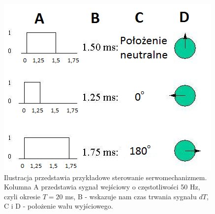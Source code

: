 \begin{figure}[H]
    \begin{center}
      \includegraphics[scale=0.7]{imgs/ster_serw.png}
 	\caption[Sterowanie serwomechanizmem.]{\small{Ilustracja przedstawia przykładowe sterowanie serwomechanizmem. Kolumna A przedstawia sygnał wejściowy o częstotliwości 50 Hz, czyli okresie $T=20$ ms, B - wskazuje nam czas trwania sygnału $dT$, C i D - położenie wału wyjściowego.}\footnotemark}
	\label{serwomechanizm_sterowanie}
    \end{center}
  \end{figure}  
  	  
